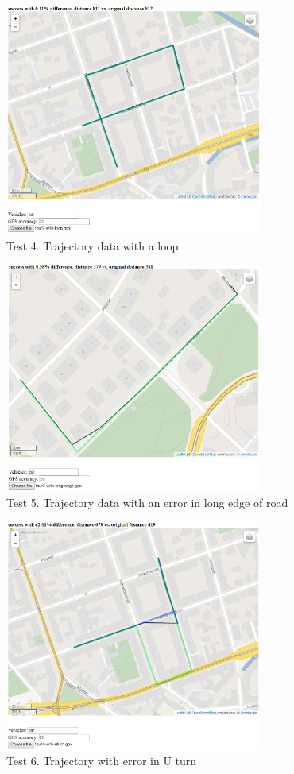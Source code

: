 \documentclass[a4paper]{article}
\begin{document}
\begin{figure}
\centering
\includegraphics[width=0.75\textwidth]{fig8.png}
\caption{\label{fig:data} Test 4. Trajectory data with a loop }
\end{figure}

\begin{figure}
\centering
\includegraphics[width=0.75\textwidth]{fig9.png}
\caption{\label{fig:data} Test 5. Trajectory data with an error in long edge of road }
\end{figure}

\begin{figure}
\centering
\includegraphics[width=0.75\textwidth]{fig10.png}
\caption{\label{fig:data} Test 6. Trajectory with error in U turn }
\end{figure}
\end{document}
